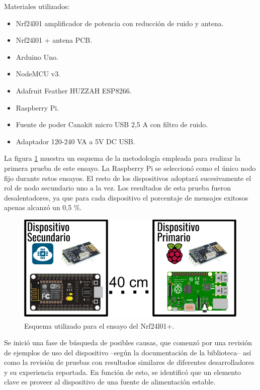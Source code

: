 Materiales utilizados:
\begin{itemize}
\item  Nrf24l01 amplificador de potencia con reducción de ruido y antena.
\item  Nrf24l01 + antena PCB.
\item  Arduino Uno.   
\item  NodeMCU v3.
\item  Adafruit Feather HUZZAH ESP8266.
\item  Raspberry Pi.
\item  Fuente de poder Canakit micro USB 2,5 A con filtro de ruido.
\item Adaptador 120-240 VA a 5V DC USB.
\end{itemize}

La figura \ref{fig:figura_a} muestra un esquema de la metodología empleada para realizar la primera prueba de este ensayo. La Raspberry Pi se seleccionó como el único nodo fijo durante estos ensayos. El resto de los dispositivos adoptará sucesivamente el rol de nodo secundario uno a la vez. Los resultados de esta prueba fueron desalentadores, ya que para cada dispositivo el porcentaje de mensajes exitosos apenas alcanzó un 0,5 \%.

\vspace{5mm} %

\begin{figure}[ht]
	\centering
	\includegraphics[scale=.45]{./Figures/Capitulo4/Figura_A.png}
	\caption{Esquema utilizado para el ensayo del Nrf24l01+.}
	\label{fig:figura_a}
\end{figure}


Se inició una fase de búsqueda de posibles causas, que comenzó por una revisión de ejemplos de uso del dispositivo --según la documentación de la biblioteca-- así como la revisión de pruebas con resultados similares de diferentes desarrolladores y su experiencia reportada. En función de esto, se identificó que un elemento clave es proveer al dispositivo de una fuente de alimentación estable.

